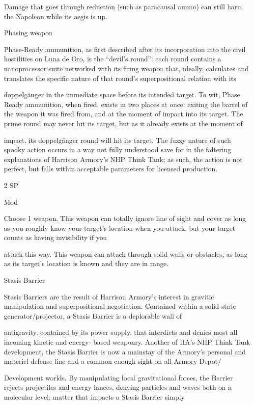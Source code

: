  Damage that goes through reduction (such as paracausal ammo) can still harm the Napoleon while its
 aegis is up.

Phasing weapon

Phase-Ready ammunition, as first described after its incorporation into the civil hostilities on Luna de Oro,
is the ``devil's round'': each round contains a nanoprocessor suite networked with its firing weapon that,
ideally, calculates and translates the specific nature of that round's superpositional relation with its

doppelgänger in the immediate space before its intended target. To wit, Phase Ready ammunition, when
fired, exists in two places at once: exiting the barrel of the weapon it was fired from, and at the moment of
impact into its target. The prime round may never hit its target, but as it already exists at the moment of

impact, its doppelgänger round will hit its target. The fuzzy nature of such spooky action occurs in a way
not fully understood save for in the faltering explanations of Harrison Armory's NHP Think Tank; as such,
the action is not perfect, but falls within acceptable parameters for licensed production.

2 SP

Mod

Choose 1 weapon. This weapon can totally ignore line of sight and cover as long as you roughly
know your target’s location when you attack, but your target counts as having invisibility if you




attack this way. This weapon can attack through solid walls or obstacles, as long as its target’s
location is known and they are in range.


Stasis Barrier

Stasis Barriers are the result of Harrison Armory's interest in gravitic manipulation and superpositional
negotiation. Contained within a solid-state generator/projector, a Stasis Barrier is a deplorable wall of

antigravity, contained by its power supply, that interdicts and denies most all incoming kinetic and energy-
based weaponry. Another of HA's NHP Think Tank development, the Stasis Barrier is now a mainstay of the
Armory's personal and materiel defense line and a common enough sight on all Armory Depot/

Development worlds. By manipulating local gravitational forces, the Barrier rejects projectiles and energy
lances, denying particles and waves both on a molecular level; matter that impacts a Stasis Barrier simply

